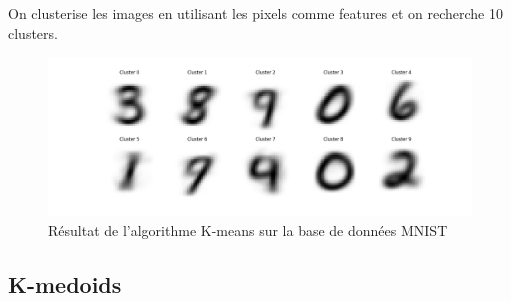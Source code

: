 \documentclass[french,a4paper,18pt]{article}
\begin{document}
On clusterise les images en utilisant les pixels comme features et on recherche 10 clusters.
\begin{figure}[h!]
    \centering
    \includegraphics[scale=0.2]{images/mnist_kmeans_ten_clusters.png}
    \caption{Résultat de l'algorithme K-means sur la base de données MNIST}\label{fig:mnist_kmeans}
\end{figure}
\subsection{K-medoids}
\end{document}
